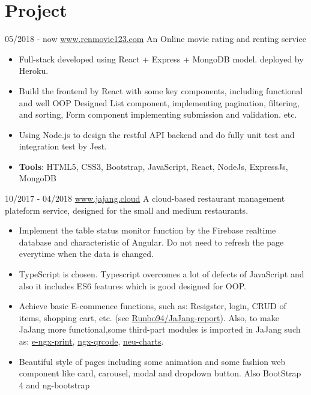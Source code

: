 \documentclass[letterpaper]{twentysecondcv} %
\begin{document}
\section{Project}
\begin{twenty}
	\twentyitem
	{05/2018}
	{- now}
	{\href{www.renmovie123.com}{www.renmovie123.com}}
	{}
	{An Online movie rating and renting service}
	{
		{\begin{itemize}
				\item Full-stack developed using React + Express + MongoDB model.
				deployed by Heroku.
				\item Build the frontend by React with some key components, including functional and well OOP Designed List component, implementing pagination, filtering, and sorting, Form component implementing submission and validation. etc.
				\item Using Node.js to design the restful API backend and do fully unit test and integration test by Jest.
				\item \textbf{Tools}: HTML5, CSS3, Bootstrap, JavaScript, React, NodeJs, ExpressJs, MongoDB  \vspace{2mm}
		\end{itemize}}
	}
	\twentyitem
	{10/2017}
	{- 04/2018}
	{\href{www.jajang.cloud}{www.jajang.cloud}}
	{}
	{A cloud-based restaurant management plateform service, designed for the small and medium restaurants.}
	{
		{\begin{itemize}
				\item Implement the table status monitor function by the Firebase realtime database and characteristic of Angular. Do not need to refresh the page everytime when the data is changed. 
				\item TypeScript is chosen. Typescript overcomes a lot of defects of JavaScript and also it includes ES6 features which is good designed for OOP. 
				\item Achieve basic E-commence functions, such as: Resigster, login, CRUD of items, shopping cart, etc. (see \href{https://github.com/Runbo94/JaJang-report}{Runbo94/JaJang-report}). Also, to make JaJang more functional,some third-part modules is imported in JaJang such as: \href{https://github.com/laixiangran/e-ngx-print}{e-ngx-print}, \href{https://github.com/nacardin/ngx-qrcode}{ngx-qrcode}, 
				\href{https://www.npmjs.com/package/neu-charts}{neu-charts}.
				\item Beautiful style of pages including some animation and some fashion web component like card, carousel, modal and dropdown button. Also BootStrap 4 and ng-bootstrap

\end{itemize}}}
\end{twenty}
\end{document}
